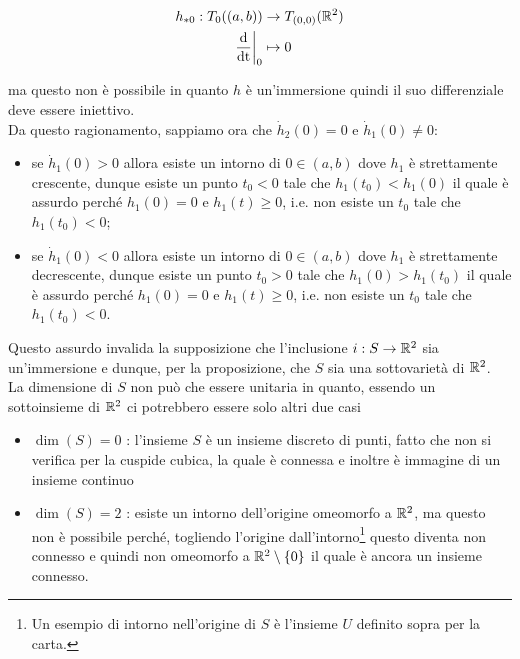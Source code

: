 \begin{align}
	\begin{split}
		h_{*0} : T_{0}((a,b)) &\to T_{(0,0)}(\mathbb{R}^{2})\\
		\left. \dfrac{\operatorname{d}}{\operatorname{dt}} \right|_{0} &\mapsto 0
	\end{split}
\end{align}

ma questo non è possibile in quanto $ h $ è un'immersione quindi il suo differenziale deve essere iniettivo.\\
Da questo ragionamento, sappiamo ora che $ \dot{h}_{2}(0)=0 $ e $ \dot{h}_{1}(0) \neq 0 $:

\begin{itemize}
	\item se $ \dot{h}_{1}(0) > 0 $ allora esiste un intorno di $ 0 \in (a,b) $ dove $ h_{1} $ è strettamente crescente, dunque esiste un punto $ t_{0}<0 $ tale che $ h_{1}(t_{0}) < h_{1}(0) $ il quale è assurdo perché $ h_{1}(0) = 0 $ e $ h_{1}(t) \geqslant 0 $, i.e. non esiste un $ t_{0} $ tale che $ h_{1}(t_{0}) < 0 $;
	
	\item se $ \dot{h}_{1}(0) < 0 $ allora esiste un intorno di $ 0 \in (a,b) $ dove $ h_{1} $ è strettamente decrescente, dunque esiste un punto $ t_{0}>0 $ tale che $ h_{1}(0) > h_{1}(t_{0}) $ il quale è assurdo perché $ h_{1}(0) = 0 $ e $ h_{1}(t) \geqslant 0 $, i.e. non esiste un $ t_{0} $ tale che $ h_{1}(t_{0}) < 0 $.
\end{itemize}

Questo assurdo invalida la supposizione che l'inclusione $ i : S \to \mathbb{R}^{2} $ sia un'immersione e dunque, per la proposizione, che $ S $ sia una sottovarietà di $ \mathbb{R}^{2} $.\\
La dimensione di $ S $ non può che essere unitaria in quanto, essendo un sottoinsieme di $ \mathbb{R}^{2} $ ci potrebbero essere solo altri due casi

\begin{itemize}
	\item $ \dim(S)=0 $ : l'insieme $ S $ è un insieme discreto di punti, fatto che non si verifica per la cuspide cubica, la quale è connessa e inoltre è immagine di un insieme continuo
	
	\item $ \dim(S)=2 $ : esiste un intorno dell'origine omeomorfo a $ \mathbb{R}^{2} $, ma questo non è possibile perché, togliendo l'origine dall'intorno\footnote{%
		Un esempio di intorno nell'origine di $ S $ è l'insieme $ U $ definito sopra per la carta.%
	} questo diventa non connesso e quindi non omeomorfo a $ \mathbb{R}^{2} \setminus \{0\} $ il quale è ancora un insieme connesso.
\end{itemize}

